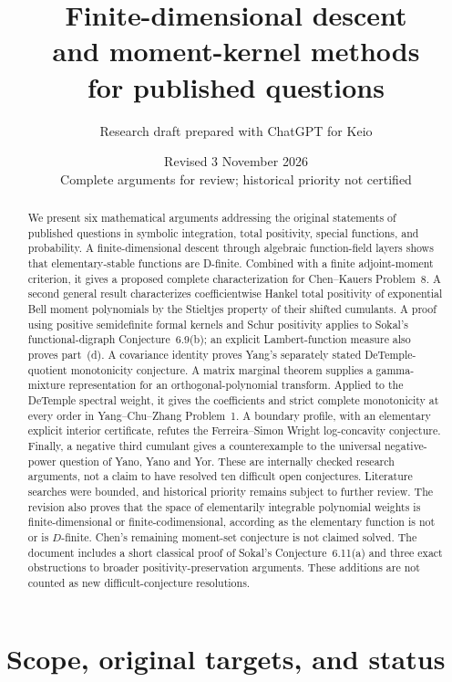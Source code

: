 \documentclass[11pt,a4paper]{article}
\title{Finite-dimensional descent\protect\\and moment-kernel methods\protect\\for published questions}
\author{Research draft prepared with ChatGPT for Keio}
\date{Revised 3 November 2026\protect\\\small Complete arguments for review; historical priority not certified}
\theoremstyle{definition}
\theoremstyle{remark}
\numberwithin{equation}{section}
\begin{document}
\maketitle
\begin{abstract}
We present six mathematical arguments addressing the original statements of
published questions in symbolic integration, total positivity, special functions,
and probability. A finite-dimensional descent through algebraic function-field
layers shows that elementary-stable functions are D-finite. Combined with a
finite adjoint-moment criterion, it gives a proposed complete characterization
for Chen--Kauers Problem~8. A second general result characterizes coefficientwise Hankel total positivity of
exponential Bell moment polynomials by the Stieltjes property of their shifted
cumulants. A proof using positive semidefinite formal kernels and Schur
positivity applies to Sokal's functional-digraph Conjecture~6.9(b); an explicit
Lambert-function measure also proves part~(d). A covariance identity proves
Yang's separately stated DeTemple-quotient monotonicity conjecture.
A matrix marginal theorem supplies a gamma-mixture representation for
an orthogonal-polynomial transform. Applied to the DeTemple spectral
weight, it gives the coefficients and strict complete monotonicity at
every order in Yang--Chu--Zhang Problem~1. A boundary
profile, with an elementary explicit interior certificate, refutes the
Ferreira--Simon Wright log-concavity conjecture. Finally, a negative third
cumulant gives a counterexample to the universal negative-power question of
Yano, Yano and Yor. These are internally checked research arguments, not a
claim to have resolved ten difficult open conjectures. Literature searches
were bounded, and historical priority remains subject to further review.
The revision also proves that the space of elementarily integrable
polynomial weights is finite-dimensional or finite-codimensional,
according as the elementary function is not or is $D$-finite.
Chen's remaining moment-set conjecture is not claimed solved.
The document includes a short classical proof of Sokal's Conjecture~6.11(a)
and three exact obstructions to broader positivity-preservation arguments.
These additions are not counted as new difficult-conjecture resolutions.
\end{abstract}

\section{Scope, original targets, and status}
\end{document}
